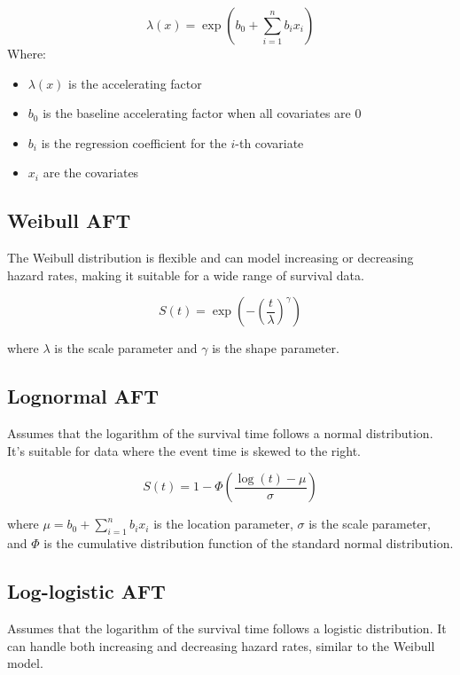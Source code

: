 \documentclass[doublespacing]{report} [12px]%
\begin{document}
\begin{equation}
\lambda(x) = \exp(b_0 + \sum_{i=1}^{n}{b_i x_i})
\end{equation}
Where:
\begin{itemize}
    \item \(\lambda(x)\) is the accelerating factor
    \item \(b_0\) is the baseline accelerating factor when all covariates are 0
    \item \(b_i\) is the regression coefficient for the \(i\)-th covariate
    \item \(x_i\) are the covariates
\end{itemize}


\subsection{Weibull AFT}
The Weibull distribution is flexible and can model increasing or decreasing hazard rates, making it suitable for a wide range of survival data.

\begin{equation}
    S(t) = \exp\left(-\left(\frac{t}{\lambda}\right)^\gamma\right)
\end{equation}

where \(\lambda\) is the scale parameter and \(\gamma\) is the shape parameter.

\subsection{Lognormal AFT}
Assumes that the logarithm of the survival time follows a normal distribution. It's suitable for data where the event time is skewed to the right.

\begin{equation}
    S(t) = 1 - \Phi\left(\frac{\log(t) - \mu}{\sigma}\right)
\end{equation}

where \(\mu = b_0 + \sum_{i=1}^{n}{b_i x_i}\) is the location parameter, \(\sigma\) is the scale parameter, and \(\Phi\) is the cumulative distribution function of the standard normal distribution.

\subsection{Log-logistic AFT}
 Assumes that the logarithm of the survival time follows a logistic distribution. It can handle both increasing and decreasing hazard rates, similar to the Weibull model.
\end{document}
